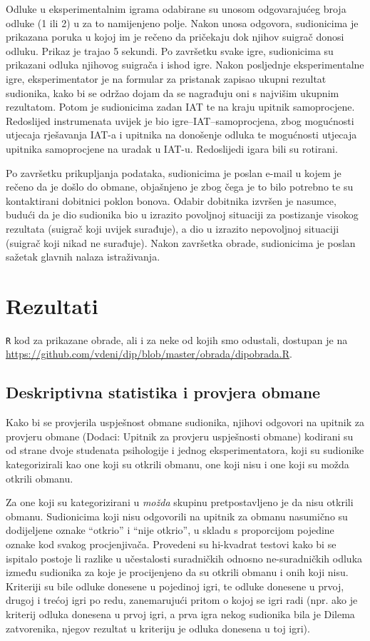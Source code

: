 \documentclass[a4paper, 12pt]{report}
\begin{document}
Odluke u eksperimentalnim igrama odabirane su unosom odgovarajućeg broja odluke
(1 ili 2) u za to namijenjeno polje. Nakon unosa odgovora, sudionicima je
prikazana poruka u kojoj im je rečeno da pričekaju dok njihov suigrač donosi
odluku. Prikaz je trajao 5 sekundi. Po završetku svake igre, sudionicima su
prikazani odluka njihovog suigrača i ishod igre. 
Nakon posljednje eksperimentalne igre, eksperimentator je  na formular za pristanak zapisao
ukupni rezultat sudionika, kako bi se održao dojam da se
nagrađuju oni s najvišim ukupnim rezultatom. Potom je sudionicima zadan IAT
te na kraju upitnik samoprocjene.
Redoslijed instrumenata uvijek je bio igre--IAT--samoprocjena, zbog mogućnosti
utjecaja rješavanja IAT-a i upitnika na donošenje odluka te mogućnosti utjecaja
upitnika samoprocjene na uradak u IAT-u. Redoslijedi
igara bili su rotirani.

Po završetku prikupljanja podataka, sudionicima je poslan e-mail u kojem je
rečeno da je došlo do obmane, objašnjeno je zbog čega je to bilo
potrebno  te su kontaktirani dobitnici poklon
bonova. Odabir dobitnika izvršen je nasumce, budući da je dio sudionika bio u izrazito
povoljnoj situaciji za postizanje visokog rezultata (suigrač koji uvijek
surađuje), a dio u izrazito nepovoljnoj situaciji (suigrač koji nikad ne
surađuje). Nakon završetka obrade, sudionicima je poslan sažetak glavnih nalaza
istraživanja.

\section{Rezultati}

\texttt{R} kod za prikazane obrade, ali i za neke od kojih smo odustali,
dostupan je na \url{https://github.com/vdeni/dip/blob/master/obrada/dipobrada.R}.

\subsection{Deskriptivna statistika i provjera obmane} 

Kako bi se provjerila uspješnost obmane sudionika, njihovi odgovori na upitnik
za provjeru obmane (Dodaci: Upitnik za provjeru uspješnosti obmane)
kodirani su od strane dvoje studenata psihologije i jednog
eksperimentatora, koji su
sudionike kategorizirali kao one koji su otkrili obmanu, one koji nisu i one
koji su možda otkrili obmanu.

Za one koji su kategorizirani u \emph{možda} skupinu pretpostavljeno je da nisu
otkrili obmanu. Sudionicima koji nisu odgovorili na upitnik za obmanu
nasumično su dodijeljene oznake \enquote{otkrio} i \enquote{nije otkrio},
u skladu s proporcijom pojedine oznake kod svakog procjenjivača.
Provedeni su hi-kvadrat testovi kako bi se ispitalo postoje li
razlike u učestalosti suradničkih odnosno ne-suradničkih odluka između sudionika
za koje je procijenjeno da su otkrili obmanu i onih koji nisu. 
Kriteriji su bile odluke donesene u pojedinoj igri, te odluke
donesene u prvoj, drugoj i trećoj igri po redu, zanemarujući pritom o kojoj se
igri radi (npr. ako je kriterij odluka donesena u prvoj igri, a prva igra nekog
sudionika bila je Dilema zatvorenika, njegov rezultat u kriteriju je odluka
donesena u toj igri).
\end{document}
